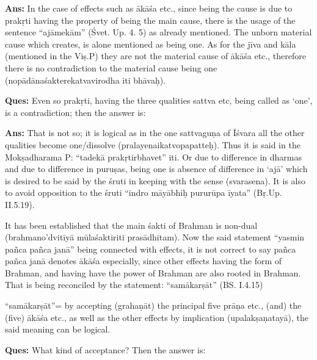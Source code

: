 
\textbf{Ans:} In the case of effects such as ākāśa etc., since being the cause is due to prakṛti having the property of being the main cause, there is the usage of the sentence “ajāmekām” (Śvet. Up. 4. 5) as already mentioned. The unborn material cause which creates, is alone mentioned as being one. As for the jīva and kāla (mentioned in the Viṣ.P) they are not the material cause of ākāśa etc., therefore there is no contradiction to the material cause being one (nopādānaśakterekatvavirodha iti bhāvaḥ).

\textbf{Ques:} Even so prakṛti, having the three qualities sattva etc, being called as ‘one’, is a contradiction; then the answer is:

\textbf{Ans:} That is not so; it is logical as in the one sattvaguṇa of Īśvara all the other qualities become one/dissolve (pralayenaikatvopapatteḥ). Thus it is said in the Mokṣadharama P: “tadekā prakṛtirbhavet” iti. Or due to difference in dharmas and due to difference in puruṣas, being one is absence of difference in ‘ajā’ which is desired to be said by the śruti in keeping with the sense (svarasena). It is also to avoid opposition to the śruti “indro māyābhiḥ pururūpa īyata” (Bṛ.Up. II.5.19). 

It has been established that the main śakti of Brahman is non-dual (brahmano’dvitīyā mūlaśaktiriti prasādhitam). Now the said statement “yasmin pañca pañca janā” being connected with effects, it is not correct to say pañca pañca janā denotes ākāśa especially, since other effects having the form of Brahman, and having have the power of Brahman are also rooted in Brahman. That is being reconciled by the statement: “samākarṣāt” (BS. I.4.15)

\textbf{}



“samākarṣāt”= by accepting (grahaṇāt) the principal five prāṇa etc., (and) the (five) ākāśa etc., as well as the other effects by implication (upalakṣaṇatayā), the said meaning can be logical. 

\textbf{Ques:} What kind of acceptance? Then the answer is:

